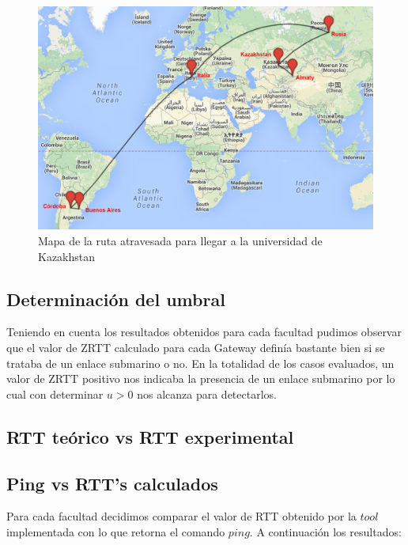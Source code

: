 \begin{figure}[H]
	\begin{center}
		  \includegraphics[scale=0.4]{../mapas/mapa_aipet.png}
		  \caption{Mapa de la ruta atravesada para llegar a la universidad de Kazakhstan}
		  \label{fig:contra1}
	\end{center}
\end{figure}

\subsection{Determinación del umbral}

Teniendo en cuenta los resultados obtenidos para cada facultad pudimos observar que el valor de ZRTT calculado para cada Gateway definía bastante bien si se trataba de un enlace submarino o no. En la totalidad de los casos evaluados, un valor de ZRTT positivo nos indicaba la presencia de un enlace submarino por lo cual con determinar $u>0$ nos alcanza para detectarlos.

\subsection{RTT teórico vs RTT experimental}

\subsection{Ping vs RTT's calculados}

Para cada facultad decidimos comparar el valor de RTT obtenido por la $tool$ implementada con lo que retorna el comando $ping$. A continuación los resultados:

